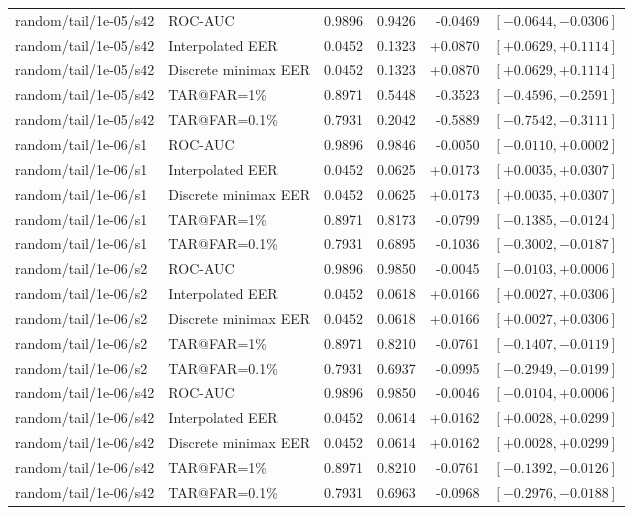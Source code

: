 \begin{table}[!t]
\begin{tabular}{@{}llrrrr@{}}
random/tail/1e-05/s42 & ROC-AUC & 0.9896 & 0.9426 & -0.0469 & $[-0.0644,-0.0306]$ \\
random/tail/1e-05/s42 & Interpolated EER & 0.0452 & 0.1323 & +0.0870 & $[+0.0629,+0.1114]$ \\
random/tail/1e-05/s42 & Discrete minimax EER & 0.0452 & 0.1323 & +0.0870 & $[+0.0629,+0.1114]$ \\
random/tail/1e-05/s42 & TAR@FAR=1\% & 0.8971 & 0.5448 & -0.3523 & $[-0.4596,-0.2591]$ \\
random/tail/1e-05/s42 & TAR@FAR=0.1\% & 0.7931 & 0.2042 & -0.5889 & $[-0.7542,-0.3111]$ \\
random/tail/1e-06/s1 & ROC-AUC & 0.9896 & 0.9846 & -0.0050 & $[-0.0110,+0.0002]$ \\
random/tail/1e-06/s1 & Interpolated EER & 0.0452 & 0.0625 & +0.0173 & $[+0.0035,+0.0307]$ \\
random/tail/1e-06/s1 & Discrete minimax EER & 0.0452 & 0.0625 & +0.0173 & $[+0.0035,+0.0307]$ \\
random/tail/1e-06/s1 & TAR@FAR=1\% & 0.8971 & 0.8173 & -0.0799 & $[-0.1385,-0.0124]$ \\
random/tail/1e-06/s1 & TAR@FAR=0.1\% & 0.7931 & 0.6895 & -0.1036 & $[-0.3002,-0.0187]$ \\
random/tail/1e-06/s2 & ROC-AUC & 0.9896 & 0.9850 & -0.0045 & $[-0.0103,+0.0006]$ \\
random/tail/1e-06/s2 & Interpolated EER & 0.0452 & 0.0618 & +0.0166 & $[+0.0027,+0.0306]$ \\
random/tail/1e-06/s2 & Discrete minimax EER & 0.0452 & 0.0618 & +0.0166 & $[+0.0027,+0.0306]$ \\
random/tail/1e-06/s2 & TAR@FAR=1\% & 0.8971 & 0.8210 & -0.0761 & $[-0.1407,-0.0119]$ \\
random/tail/1e-06/s2 & TAR@FAR=0.1\% & 0.7931 & 0.6937 & -0.0995 & $[-0.2949,-0.0199]$ \\
random/tail/1e-06/s42 & ROC-AUC & 0.9896 & 0.9850 & -0.0046 & $[-0.0104,+0.0006]$ \\
random/tail/1e-06/s42 & Interpolated EER & 0.0452 & 0.0614 & +0.0162 & $[+0.0028,+0.0299]$ \\
random/tail/1e-06/s42 & Discrete minimax EER & 0.0452 & 0.0614 & +0.0162 & $[+0.0028,+0.0299]$ \\
random/tail/1e-06/s42 & TAR@FAR=1\% & 0.8971 & 0.8210 & -0.0761 & $[-0.1392,-0.0126]$ \\
random/tail/1e-06/s42 & TAR@FAR=0.1\% & 0.7931 & 0.6963 & -0.0968 & $[-0.2976,-0.0188]$ \\
\bottomrule
\end{tabular}
\end{table}
